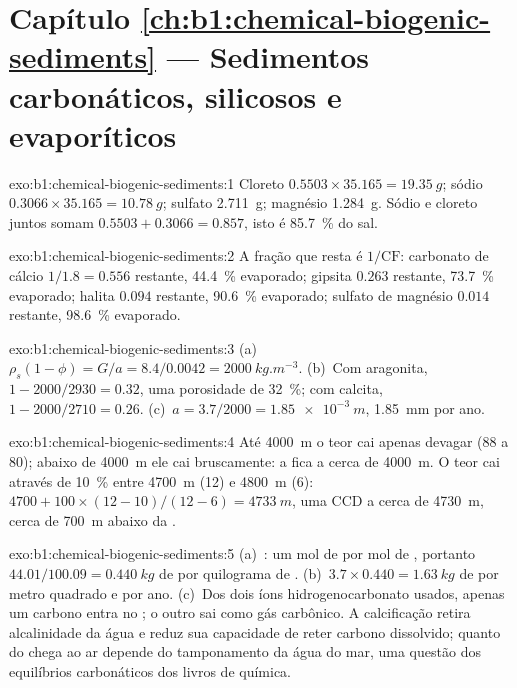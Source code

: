 \section*{Capítulo \ref{ch:b1:chemical-biogenic-sediments} --- Sedimentos carbonáticos, silicosos e evaporíticos}

\begin{solution}{exo:b1:chemical-biogenic-sediments:1}
Cloreto $0.5503\times35.165 = \qty{19.35}{g}$; sódio $0.3066\times35.165 =
\qty{10.78}{g}$; sulfato \qty{2.711}{g}; magnésio \qty{1.284}{g}. Sódio e
cloreto juntos somam $0.5503 + 0.3066 = 0.857$, isto é \qty{85.7}{\%} do
sal.
\end{solution}

\begin{solution}{exo:b1:chemical-biogenic-sediments:2}
A fração que resta é $1/\mathrm{CF}$: carbonato de cálcio $1/1.8 = 0.556$ restante,
\qty{44.4}{\%} evaporado; gipsita $0.263$ restante, \qty{73.7}{\%} evaporado;
halita $0.094$ restante, \qty{90.6}{\%} evaporado; sulfato de magnésio $0.014$ restante,
\qty{98.6}{\%} evaporado.
\end{solution}

\begin{solution}{exo:b1:chemical-biogenic-sediments:3}
(a)~$\rho_s(1-\phi) = G/a = 8.4/0.0042 = \qty{2000}{kg.m^{-3}}$. (b)~Com
aragonita, $1 - 2000/2930 = 0.32$, uma porosidade de \qty{32}{\%}; com calcita,
$1 - 2000/2710 = 0.26$. (c)~$a = 3.7/2000 = \qty{1.85e-3}{m}$, \qty{1.85}{mm} por
ano.
\end{solution}

\begin{solution}{exo:b1:chemical-biogenic-sediments:4}
Até \qty{4000}{m} o teor cai apenas devagar (88 a 80); abaixo de
\qty{4000}{m} ele cai bruscamente: a  fica a cerca de \qty{4000}{m}. O
teor cai através de \qty{10}{\%} entre \qty{4700}{m} (12) e \qty{4800}{m}
(6): $4700 + 100\times(12-10)/(12-6) = \qty{4733}{m}$, uma CCD a cerca de
\qty{4730}{m}, cerca de \qty{700}{m} abaixo da .
\end{solution}

\begin{solution}{exo:b1:chemical-biogenic-sediments:5}
(a)~: um mol de  por mol de
, portanto $44.01/100.09 = \qty{0.440}{kg}$ de  por quilograma de
. (b)~$3.7\times0.440 = \qty{1.63}{kg}$ de  por metro quadrado e
por ano. (c)~Dos dois íons hidrogenocarbonato usados, apenas um carbono entra no
; o outro sai como gás carbônico. A calcificação retira alcalinidade da água e
reduz sua capacidade de reter carbono dissolvido; quanto do  chega ao ar
depende do tamponamento da água do mar, uma questão dos equilíbrios carbonáticos dos
livros de química.
\end{solution}

